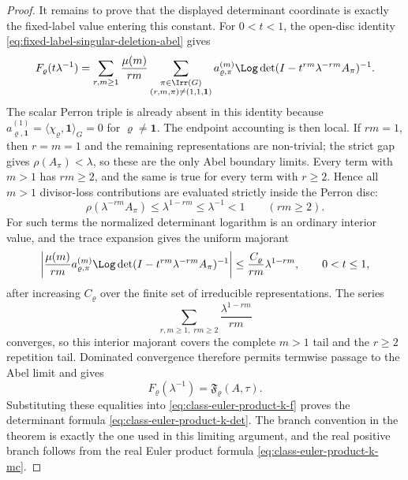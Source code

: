 \begin{proof}
  It remains to prove that the displayed determinant coordinate is exactly the
  fixed-label value entering this constant.  For \(0<t<1\), the open-disc
  identity \eqref{eq:fixed-label-singular-deletion-abel} gives
  \[
    F_\varrho(t\lambda^{-1})
    =
    \sum_{r,m\ge1}\frac{\mu(m)}{rm}
      \sum_{\substack{\pi\in\Irr(G)\\(r,m,\pi)\neq(1,1,\mathbf1)}}
        a_{\varrho,\pi}^{(m)}
        \Log\det(I-t^{rm}\lambda^{-rm}A_\pi)^{-1}.
  \]
  The scalar Perron triple is already absent in this identity because
  \(a_{\varrho,\mathbf1}^{(1)}
  =\langle\chi_\varrho,\mathbf1\rangle_G=0\) for
  \(\varrho\ne\mathbf1\).  The endpoint accounting is then local.  If
  \(rm=1\), then \(r=m=1\) and the remaining representations are
  non-trivial; the strict gap gives \(\rho(A_\pi)<\lambda\), so these are the
  only Abel boundary limits.  Every term with \(m>1\) has \(rm\ge2\), and the
  same is true for every term with \(r\ge2\).  Hence all \(m>1\) divisor-loss
  contributions are evaluated strictly inside the Perron disc:
  \[
    \rho(\lambda^{-rm}A_\pi)\le \lambda^{1-rm}\le\lambda^{-1}<1
    \qquad(rm\ge2).
  \]
  For such terms the normalized determinant logarithm is an ordinary interior
  value, and the trace expansion gives the uniform majorant
  \[
    \left|
      \frac{\mu(m)}{rm}a_{\varrho,\pi}^{(m)}
      \Log\det(I-t^{rm}\lambda^{-rm}A_\pi)^{-1}
    \right|
    \le
    \frac{C_\varrho}{rm}\lambda^{1-rm},
    \qquad 0<t\le1,
  \]
  after increasing \(C_\varrho\) over the finite set of irreducible
  representations.  The series
  \[
    \sum_{r,m\ge1,\;rm\ge2}\frac{\lambda^{1-rm}}{rm}
  \]
  converges, so this interior majorant covers the complete \(m>1\) tail and
  the \(r\ge2\) repetition tail.  Dominated convergence therefore permits
  termwise passage to the Abel limit and gives
  \[
    F_\varrho(\lambda^{-1})=\mathfrak F_\varrho(A,\tau).
  \]
  Substituting these equalities into
  \eqref{eq:class-euler-product-k-f} proves the determinant formula
  \eqref{eq:class-euler-product-k-det}.  The branch convention in the theorem
  is exactly the one used in this limiting argument, and the real positive
  branch follows from the real Euler product formula
  \eqref{eq:class-euler-product-k-mc}.
\end{proof}

